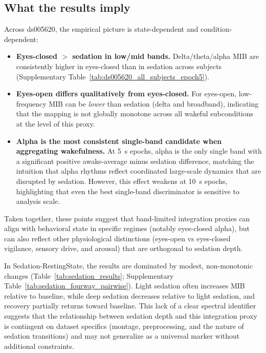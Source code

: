 \documentclass[11pt]{article}
\begin{document}
\subsection*{What the results imply}
Across ds005620, the empirical picture is state-dependent and condition-dependent:
\begin{itemize}[leftmargin=*]
    \item \textbf{Eyes-closed $>$ sedation in low/mid bands.} Delta/theta/alpha MIB are consistently higher in eyes-closed than in sedation across subjects (Supplementary Table~\ref{tab:ds005620_all_subjects_epoch5}).
    \item \textbf{Eyes-open differs qualitatively from eyes-closed.} For eyes-open, low-frequency MIB can be \emph{lower} than sedation (delta and broadband), indicating that the mapping  is not globally monotone across all wakeful subconditions at the level of this proxy.
    \item \textbf{Alpha is the most consistent single-band candidate when aggregating wakefulness.} At \SI{5}{s} epochs, alpha is the only single band with a significant positive awake-average minus sedation difference, matching the intuition that alpha rhythms reflect coordinated large-scale dynamics that are disrupted by sedation. However, this effect weakens at \SI{10}{s} epochs, highlighting that even the best single-band discriminator is sensitive to analysis scale.
\end{itemize}
Taken together, these points suggest that band-limited integration proxies can align with behavioral state in specific regimes (notably eyes-closed alpha), but can also reflect other physiological distinctions (eyes-open vs eyes-closed vigilance, sensory drive, and arousal) that are orthogonal to sedation depth.

In Sedation-RestingState, the results are dominated by modest, non-monotonic changes (Table~\ref{tab:sedation_results}; Supplementary Table~\ref{tab:sedation_fourway_pairwise}). Light sedation often increases MIB relative to baseline, while deep sedation decreases relative to light sedation, and recovery partially returns toward baseline. This lack of a clear spectral identifier suggests that the relationship between sedation depth and this integration proxy is contingent on dataset specifics (montage, preprocessing, and the nature of sedation transitions) and may not generalize as a universal marker without additional constraints.
\end{document}
